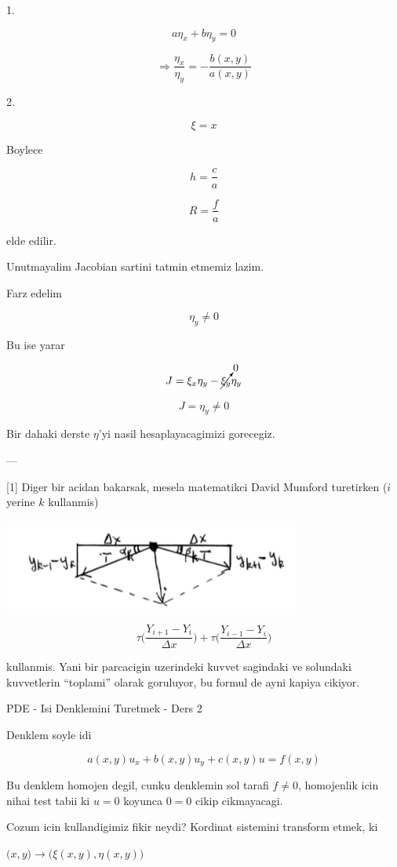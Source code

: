 \documentclass[12pt,fleqn]{article}
\begin{document}
1.

\[ a \eta_x + b \eta_y = 0 \]

\[ \Rightarrow \frac{\eta_x}{\eta_y} = -\frac{b(x,y)}{a(x,y)}\]

2. 

\[ \xi = x \]

Boylece 

\[ h = \frac{c}{a} \]

\[ R = \frac{f}{a} \]

elde edilir. 

Unutmayalim Jacobian sartini tatmin etmemiz lazim. 

Farz edelim 

\[ \eta_y \ne 0 \]

Bu ise yarar

\[ J = \xi_x\eta_y - \cancelto{0}{\xi_y}\eta_y \]

\[ J = \eta_y \ne 0 \]

Bir dahaki derste $\eta$'yi nasil hesaplayacagimizi gorecegiz. 

---

[1] Diger bir acidan bakarsak, mesela matematikci David Mumford
turetirken ($i$ yerine $k$ kullanmis)

\includegraphics[height=3cm]{1_15.png}

\[ 
\tau \bigg( \frac{Y_{i+1}- Y_i}{\Delta x} \bigg) +
\tau \bigg( \frac{Y_{i-1}- Y_{i}}{\Delta x} \bigg) 
\]

kullanmis. Yani bir parcacigin uzerindeki kuvvet sagindaki ve solundaki
kuvvetlerin ``toplami'' olarak goruluyor, bu formul de ayni kapiya cikiyor.


PDE - Isi Denklemini Turetmek - Ders 2

Denklem soyle idi

\[ a(x,y)u_x + b(x,y)u_y + c(x,y)u = f(x,y) \]

Bu denklem homojen degil, cunku denklemin sol tarafi $f \ne 0$, homojenlik
icin nihai test tabii ki $u=0$ koyunca $0=0$ cikip cikmayacagi.

Cozum icin kullandigimiz fikir neydi? Kordinat sistemini transform etmek,
ki 

$\bigg(x,y\bigg) \to \bigg(\xi(x,y), \eta(x,y)\bigg)$
\end{document}
